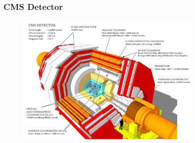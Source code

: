 \begin{frame}
\frametitle{CMS Detector}

\begin{figure}[htbp]
\begin{center}
\includegraphics[width=0.8\textwidth]{images/cms_120918_03_small.png}
\end{center}
\end{figure}


\end{frame}



